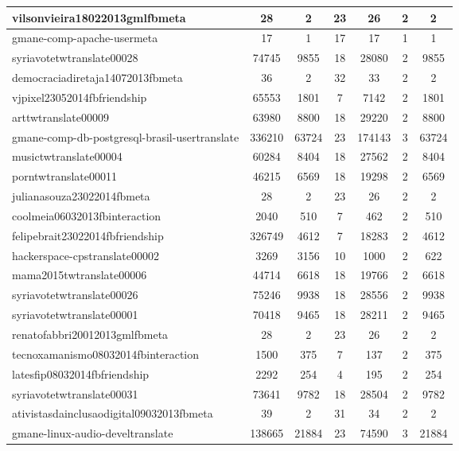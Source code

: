 \begin{table*}[h!]
\begin{center}
\begin{tabular}{| l | c | c | c | c | c | c |}
vilsonvieira18022013gmlfbmeta & 28  & 2  & 23  & 26  & 2  & 2 \\\hline
gmane-comp-apache-usermeta & 17  & 1  & 17  & 17  & 1  & 1 \\\hline
syriavotetwtranslate00028 & 74745  & 9855  & 18  & 28080  & 2  & 9855 \\\hline
democraciadiretaja14072013fbmeta & 36  & 2  & 32  & 33  & 2  & 2 \\\hline
vjpixel23052014fbfriendship & 65553  & 1801  & 7  & 7142  & 2  & 1801 \\\hline
arttwtranslate00009 & 63980  & 8800  & 18  & 29220  & 2  & 8800 \\\hline
gmane-comp-db-postgresql-brasil-usertranslate & 336210  & 63724  & 23  & 174143  & 3  & 63724 \\\hline
musictwtranslate00004 & 60284  & 8404  & 18  & 27562  & 2  & 8404 \\\hline
porntwtranslate00011 & 46215  & 6569  & 18  & 19298  & 2  & 6569 \\\hline
julianasouza23022014fbmeta & 28  & 2  & 23  & 26  & 2  & 2 \\\hline
coolmeia06032013fbinteraction & 2040  & 510  & 7  & 462  & 2  & 510 \\\hline
felipebrait23022014fbfriendship & 326749  & 4612  & 7  & 18283  & 2  & 4612 \\\hline
hackerspace-cpstranslate00002 & 3269  & 3156  & 10  & 1000  & 2  & 622 \\\hline
mama2015twtranslate00006 & 44714  & 6618  & 18  & 19766  & 2  & 6618 \\\hline
syriavotetwtranslate00026 & 75246  & 9938  & 18  & 28556  & 2  & 9938 \\\hline
syriavotetwtranslate00001 & 70418  & 9465  & 18  & 28211  & 2  & 9465 \\\hline
renatofabbri20012013gmlfbmeta & 28  & 2  & 23  & 26  & 2  & 2 \\\hline
tecnoxamanismo08032014fbinteraction & 1500  & 375  & 7  & 137  & 2  & 375 \\\hline
latesfip08032014fbfriendship & 2292  & 254  & 4  & 195  & 2  & 254 \\\hline
syriavotetwtranslate00031 & 73641  & 9782  & 18  & 28504  & 2  & 9782 \\\hline
ativistasdainclusaodigital09032013fbmeta & 39  & 2  & 31  & 34  & 2  & 2 \\\hline
gmane-linux-audio-develtranslate & 138665  & 21884  & 23  & 74590  & 3  & 21884 \\\hline

\end{tabular}
\end{center}
\end{table*}

